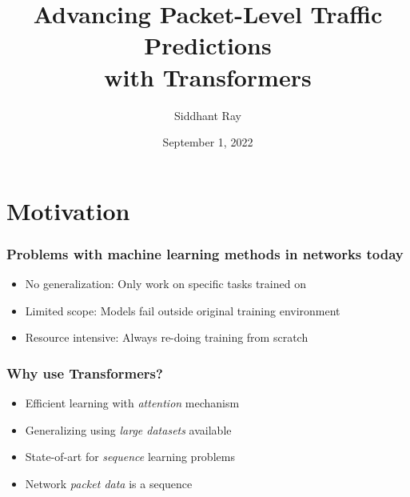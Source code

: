 \documentclass{beamer}
\title[Master Thesis] %
{Advancing Packet-Level Traffic Predictions\\ with Transformers}
\date{\tiny September 1, 2022}
\author[ Siddhant Ray] %
{Siddhant Ray}
\institute[ETH Zürich] %
{
  D-ITET \\
  ETH Zürich
}
\begin{document}
\frame{\titlepage}


%


\section{Motivation}

\begin{frame}
\frametitle{Problems with machine learning methods in networks today}
\pause
\begin{itemize}
    \item<1-> \alert{No generalization: } Only work on specific tasks trained on 
    \pause
    \item<2-> \alert{Limited scope: } Models fail outside original training environment 
    \pause
    \item<3-> \alert{Resource intensive: } Always re-doing training from scratch
   
\end{itemize}
\end{frame}



\begin{frame}
\frametitle{Why use Transformers?}
\pause
\begin{itemize}
    \item<1-> Efficient learning with \alert {\emph{attention}} mechanism
    \item<1-> Generalizing using \alert{\emph{large datasets}} available
    \pause
    \item<2-> State-of-art for \alert{\emph{sequence}} learning problems
     \item<2-> Network \alert{\emph{packet data}} is a sequence
\end{itemize}
\end{frame}
\end{document}
